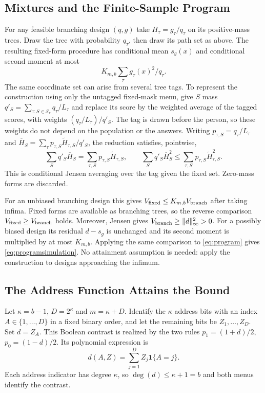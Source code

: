 \subsection{Mixtures and the Finite-Sample Program}
For any feasible branching design $(q,g)$ take $H_\tau=g_\tau/q_\tau$ on its positive-mass trees. Draw the tree with probability $q_\tau$, then draw its path set as above. The resulting fixed-form procedure has conditional mean $s_g(x)$ and conditional second moment at most
\[
 K_{m,b}\sum_\tau g_\tau(x)^2/q_\tau.
\]
The same coordinate set can arise from several tree tags. To represent the construction using only the untagged fixed-mask menu, give $S$ mass $q'_S=\sum_{\tau:S\in\mathcal S_\tau}q_\tau/L_\tau$ and replace its score by the weighted average of the tagged scores, with weights $(q_\tau/L_\tau)/q'_S$. The tag is drawn before the person, so these weights do not depend on the population or the answers. Writing $p_{\tau,S}=q_\tau/L_\tau$ and $\overline H_S=\sum_\tau p_{\tau,S}\widetilde H_{\tau,S}/q'_S$, the reduction satisfies, pointwise,
\[
 \sum_Sq'_S\overline H_S=\sum_{\tau,S}p_{\tau,S}\widetilde H_{\tau,S},
 \qquad
 \sum_Sq'_S\overline H_S^2\le\sum_{\tau,S}p_{\tau,S}\widetilde H_{\tau,S}^2.
\]
This is conditional Jensen averaging over the tag given the fixed set. Zero-mass forms are discarded.

For an unbiased branching design this gives $V_{\rm fixed}\le K_{m,b}V_{\rm branch}$ after taking infima. Fixed forms are available as branching trees, so the reverse comparison $V_{\rm fixed}\ge V_{\rm branch}$ holds. Moreover, Jensen gives $V_{\rm branch}\ge\|d\|_\infty^2>0$. For a possibly biased design its residual $d-s_g$ is unchanged and its second moment is multiplied by at most $K_{m,b}$. Applying the same comparison to \eqref{eq:program} gives \eqref{eq:programsimulation}. No attainment assumption is needed: apply the construction to designs approaching the infimum.

\subsection{The Address Function Attains the Bound}
Let $\kappa=b-1$, $D=2^\kappa$ and $m=\kappa+D$. Identify the $\kappa$ address bits with an index $A\in\{1,\ldots,D\}$ in a fixed binary order, and let the remaining bits be $Z_1,\ldots,Z_D$. Set $d=Z_A$. This Boolean contrast is realized by the two rules $p_1=(1+d)/2$, $p_0=(1-d)/2$. Its polynomial expression is
\[
 d(A,Z)=\sum_{j=1}^D Z_j\mathbf1\{A=j\}.
\]
Each address indicator has degree $\kappa$, so $\deg(d)\le \kappa+1=b$ and both menus identify the contrast.

